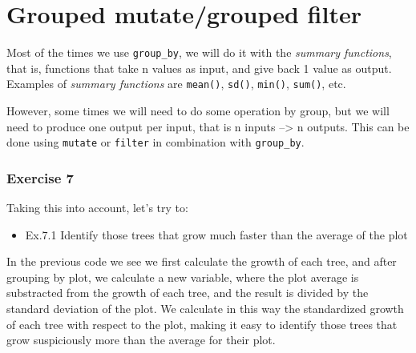 \documentclass[]{article}
\newenvironment{Shaded}{\begin{snugshade}}{\end{snugshade}}
\newcommand{\KeywordTok}[1]{\textcolor[rgb]{0.13,0.29,0.53}{\textbf{#1}}}
\newcommand{\DataTypeTok}[1]{\textcolor[rgb]{0.13,0.29,0.53}{#1}}
\newcommand{\StringTok}[1]{\textcolor[rgb]{0.31,0.60,0.02}{#1}}
\newcommand{\OperatorTok}[1]{\textcolor[rgb]{0.81,0.36,0.00}{\textbf{#1}}}
\newcommand{\NormalTok}[1]{#1}
\providecommand{\tightlist}{%
  \setlength{\itemsep}{0pt}\setlength{\parskip}{0pt}}
\begin{document}
\section{Grouped mutate/grouped
filter}\label{grouped-mutategrouped-filter}

Most of the times we use \texttt{group\_by}, we will do it with the
\emph{summary functions}, that is, functions that take n values as
input, and give back 1 value as output. Examples of \emph{summary
functions} are \texttt{mean()}, \texttt{sd()}, \texttt{min()},
\texttt{sum()}, etc.

However, some times we will need to do some operation by group, but we
will need to produce one output per input, that is n inputs
--\textgreater{} n outputs. This can be done using \texttt{mutate} or
\texttt{filter} in combination with \texttt{group\_by}.

\subsubsection{Exercise 7}\label{exercise-7}

Taking this into account, let's try to:

\begin{itemize}
\tightlist
\item
  Ex.7.1 Identify those trees that grow much faster than the average of
  the plot
\end{itemize}

\begin{Shaded}
\end{Shaded}

In the previous code we see we first calculate the growth of each tree,
and after grouping by plot, we calculate a new variable, where the plot
average is substracted from the growth of each tree, and the result is
divided by the standard deviation of the plot. We calculate in this way
the standardized growth of each tree with respect to the plot, making it
easy to identify those trees that grow suspiciously more than the
average for their plot.
\end{document}

